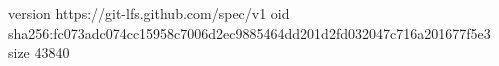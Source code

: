 version https://git-lfs.github.com/spec/v1
oid sha256:fc073adc074cc15958c7006d2ec9885464dd201d2fd032047c716a201677f5e3
size 43840

